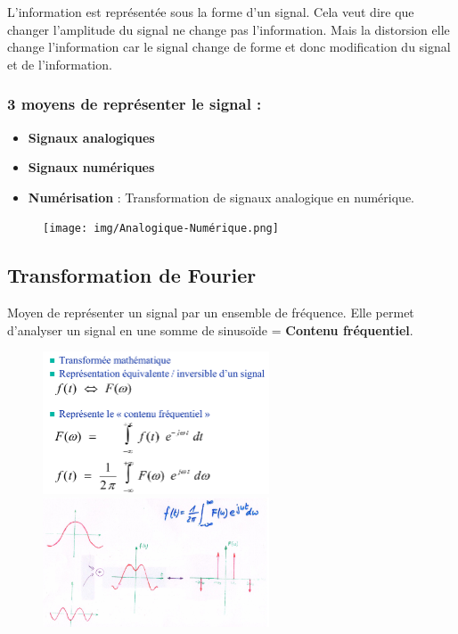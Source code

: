 	
	L'information est représentée sous la forme d'un signal. Cela veut dire que changer l'amplitude du signal ne change pas l'information. Mais la distorsion elle change l'information car le signal change de forme et donc modification du signal et de l'information.
	
\subsubsection*{3 moyens de représenter le signal :}
	\begin{itemize}
		\item \textbf{Signaux analogiques}
		\item \textbf{Signaux numériques}
		\item \textbf{Numérisation} : Transformation de signaux analogique en numérique.
	\end{itemize}
		\begin{figure}[H]
			\centering
			\texttt{[image: img/Analogique-Numérique.png]}
		\end{figure}
		
	\subsection{Transformation de Fourier}
		Moyen de représenter un signal par un ensemble de fréquence. Elle permet d'analyser un signal en une somme de sinusoïde = \textbf{Contenu fréquentiel}.
		\begin{figure}[H]
			\centering
			\includegraphics[width=0.6\textwidth]{img/Fourrier.png}
			\includegraphics[width=0.6\textwidth]{img/FourrierExemple.png}
		\end{figure}
		
